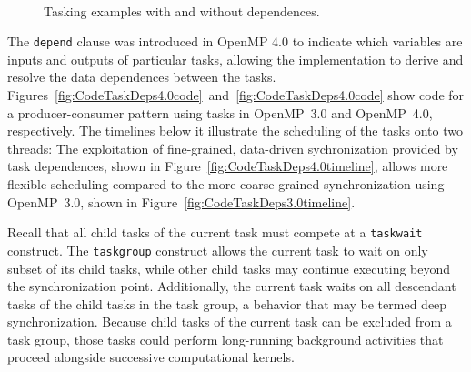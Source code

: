 \begin{figure}
~
~
\caption{Tasking examples with and without dependences.\label{fig:CodeTaskDeps}}
\end{figure}


The \texttt{depend} clause was introduced in OpenMP 4.0 to indicate which variables are inputs and outputs of particular tasks, allowing the implementation to derive and resolve the data dependences between the tasks.  Figures~\ref{fig:CodeTaskDeps4.0code}~and~\ref{fig:CodeTaskDeps4.0code} show code for a producer-consumer pattern using tasks in OpenMP~3.0 and OpenMP~4.0, respectively.  The timelines below it illustrate the scheduling of the tasks onto two threads:  The exploitation of fine-grained, data-driven sychronization provided by task dependences, shown in Figure~\ref{fig:CodeTaskDeps4.0timeline}, allows more flexible scheduling compared to the more coarse-grained synchronization using OpenMP~3.0, shown in Figure~\ref{fig:CodeTaskDeps3.0timeline}.



Recall that all child tasks of the current task must compete at a \texttt{taskwait} construct.  The \texttt{taskgroup} construct allows the current task to wait on only subset of its child tasks, while other child tasks may continue executing beyond the synchronization point.  Additionally, the current task waits on all descendant tasks of the child tasks in the task group, a behavior that may be termed deep synchronization.  Because child tasks of the current task can be excluded from a task group, those tasks could perform long-running background activities that proceed alongside successive computational kernels.


